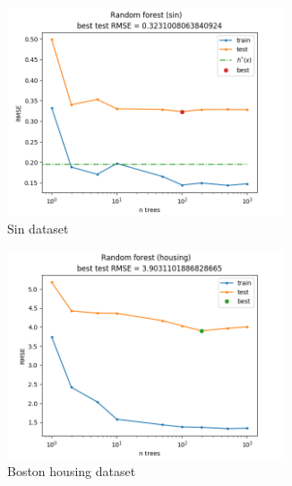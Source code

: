 \documentclass[12pt]{article}
\begin{document}
\begin{figure}[!h]
    \centering
    \begin{subfigure}[b]{0.49\textwidth}
        \centering
        \includegraphics[width=0.9\textwidth]{plots/02/01-sin.png}
        \caption{Sin dataset}
        \label{fig:02-sin}
    \end{subfigure}
    \begin{subfigure}[b]{0.49\textwidth}
        \centering
        \includegraphics[width=0.9\textwidth]{plots/02/02-housing.png}
        \caption{Boston housing dataset}
        \label{fig:02-housing}
    \end{subfigure}
    \begin{subfigure}[b]{0.49\textwidth}
        \centering

\end{subfigure}
\end{figure}
\end{document}
